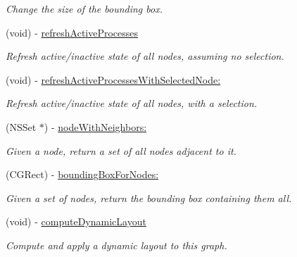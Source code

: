 \begin{DoxyCompactItemize}
\begin{DoxyCompactList}\small\item\em Change the size of the bounding box. \end{DoxyCompactList}\item 
\hypertarget{interface_p_c_graph_model_a36b1a11bb18098dbe42a727eaf2a7140}{
(void) -\/ \hyperlink{interface_p_c_graph_model_a36b1a11bb18098dbe42a727eaf2a7140}{refreshActiveProcesses}}
\label{interface_p_c_graph_model_a36b1a11bb18098dbe42a727eaf2a7140}

\begin{DoxyCompactList}\small\item\em Refresh active/inactive state of all nodes, assuming no selection. \end{DoxyCompactList}\item 
\hypertarget{interface_p_c_graph_model_a870f26b78ccab50cb3d3f364aeb32e1f}{
(void) -\/ \hyperlink{interface_p_c_graph_model_a870f26b78ccab50cb3d3f364aeb32e1f}{refreshActiveProcessesWithSelectedNode:}}
\label{interface_p_c_graph_model_a870f26b78ccab50cb3d3f364aeb32e1f}

\begin{DoxyCompactList}\small\item\em Refresh active/inactive state of all nodes, with a selection. \end{DoxyCompactList}\item 
\hypertarget{interface_p_c_graph_model_afd4697a9ab2d3f99c2548c6b2a8fa0db}{
(NSSet $\ast$) -\/ \hyperlink{interface_p_c_graph_model_afd4697a9ab2d3f99c2548c6b2a8fa0db}{nodeWithNeighbors:}}
\label{interface_p_c_graph_model_afd4697a9ab2d3f99c2548c6b2a8fa0db}

\begin{DoxyCompactList}\small\item\em Given a node, return a set of all nodes adjacent to it. \end{DoxyCompactList}\item 
\hypertarget{interface_p_c_graph_model_a41718be28b9fae9f714474f2927c5295}{
(CGRect) -\/ \hyperlink{interface_p_c_graph_model_a41718be28b9fae9f714474f2927c5295}{boundingBoxForNodes:}}
\label{interface_p_c_graph_model_a41718be28b9fae9f714474f2927c5295}

\begin{DoxyCompactList}\small\item\em Given a set of nodes, return the bounding box containing them all. \end{DoxyCompactList}\item 
\hypertarget{interface_p_c_graph_model_a3d85d374548f95f6417135d9710946ef}{
(void) -\/ \hyperlink{interface_p_c_graph_model_a3d85d374548f95f6417135d9710946ef}{computeDynamicLayout}}
\label{interface_p_c_graph_model_a3d85d374548f95f6417135d9710946ef}

\begin{DoxyCompactList}\small\item\em Compute and apply a dynamic layout to this graph. \end{DoxyCompactList}\end{DoxyCompactItemize}
